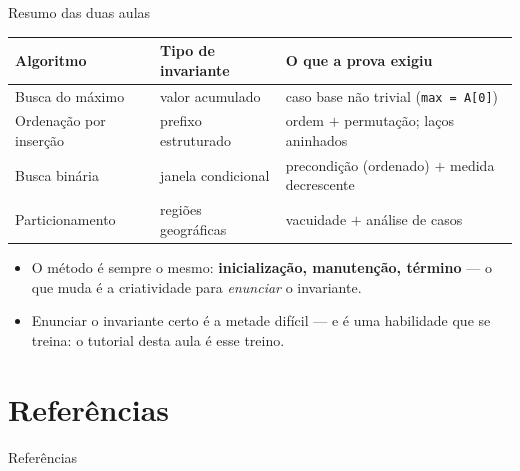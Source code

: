 \documentclass[aspectratio=169]{beamer}
\begin{document}
\begin{frame}{Resumo das duas aulas}
  \begin{center}
  \footnotesize
  \begin{tabular}{l l l}
    \toprule
    Algoritmo & Tipo de invariante & O que a prova exigiu \\
    \midrule
    Busca do máximo & valor acumulado & caso base não trivial (\texttt{max = A[0]}) \\
    Ordenação por inserção & prefixo estruturado & ordem $+$ permutação; laços aninhados \\
    Busca binária & janela condicional & precondição (ordenado) $+$ medida decrescente \\
    Particionamento & regiões geográficas & vacuidade $+$ análise de casos \\
    \bottomrule
  \end{tabular}
  \end{center}
  \begin{itemize}
    \item O método é sempre o mesmo: \textbf{inicialização, manutenção, término} ---
      o que muda é a criatividade para \emph{enunciar} o invariante.
    \item Enunciar o invariante certo é a metade difícil --- e é uma habilidade que se
      treina: o tutorial desta aula é esse treino.
  \end{itemize}
\end{frame}

\section*{Referências}
\begin{frame}[allowframebreaks]{Referências}
  \nocite{*}
  
  
\end{frame}
\end{document}
